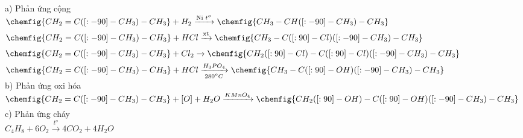 \documentclass[a4paper]{article}
\newcommand\tab[1][1cm]{\hspace*{#1}}
\begin{document}
a) Phản ứng cộng\\
$\chemfig{CH_{2}=C([:-90]-CH_{3})-CH_{3}}+H_{2}\xrightarrow[\text{}]{\text{Ni $t^o$}}\chemfig{CH_{3}-CH([:-90]-CH_{3})-CH_{3}}$\\
$\chemfig{CH_{2}=C([:-90]-CH_{3})-CH_{3}}+HCl\xrightarrow[\text{}]{\text{xt}}\chemfig{CH_{3}-C([:90]-Cl)([:-90]-CH_{3})-CH_{3}}$\\
$\chemfig{CH_{2}=C([:-90]-CH_{3})-CH_{3}}+Cl_{2}\xrightarrow[\text{}]{\text{}}\chemfig{CH_{2}([:90]-Cl)-C([:90]-Cl)([:-90]-CH_{3})-CH_{3}}$\\
$\chemfig{CH_{2}=C([:-90]-CH_{3})-CH_{3}}+HCl\xrightarrow[\text{$280^{o}C$}]{\text{$H_{3}PO_{4}$}}\chemfig{CH_{3}-C([:90]-OH)([:-90]-CH_{3})-CH_{3}}$\\
b) Phản ứng oxi hóa\\
$\chemfig{CH_{2}=C([:-90]-CH_{3})-CH_{3}}+[O]+H_{2}O\xrightarrow[\text{}]{\text{$KMnO_{4}$}}\chemfig{CH_{2}([:90]-OH)-C([:90]-OH)([:-90]-CH_{3})-CH_{3}}$\\
c) Phản ứng cháy\\
\tab $C_{4}H_{8}+6O_{2} \xrightarrow[\text{}]{\text{$t^{o}$}}4CO_{2} +4H_{2}O$\\
\end{document}

